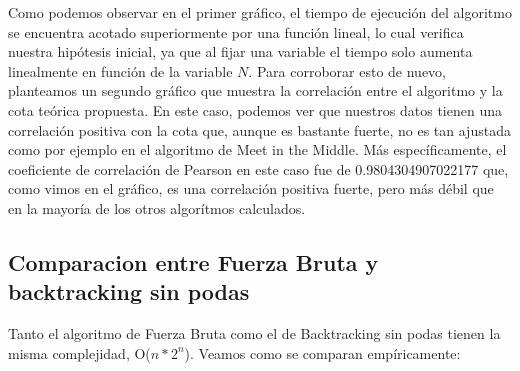 Como podemos observar en el primer gráfico, el tiempo de ejecución del algoritmo se encuentra acotado superiormente por una función lineal, lo cual verifica nuestra hipótesis inicial, ya que al fijar una variable el tiempo solo aumenta linealmente en función de la variable $N$. Para corroborar esto de nuevo, planteamos un segundo gráfico que muestra la correlación entre el algoritmo y la cota teórica propuesta. En este caso, podemos ver que nuestros datos tienen una correlación positiva con la cota que, aunque es bastante fuerte, no es tan ajustada como por ejemplo en el algoritmo de Meet in the Middle. Más específicamente, el coeficiente de correlación de Pearson en este caso fue de 0.9804304907022177 que, como vimos en el gráfico, es una correlación positiva fuerte, pero más débil que en la mayoría de los otros algorítmos calculados.
\newpage
\subsection{Comparacion entre Fuerza Bruta y backtracking sin podas}
Tanto el algoritmo de Fuerza Bruta como el de Backtracking sin podas tienen la misma complejidad, O($n*2^{n}$). Veamos como se comparan empíricamente:

